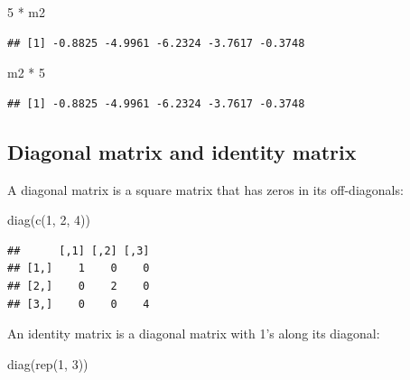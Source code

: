 \documentclass[
  12pt,
]{krantz}
\newenvironment{Shaded}{\begin{snugshade}}{\end{snugshade}}
\newcommand{\DecValTok}[1]{\textcolor[rgb]{0.00,0.00,0.81}{#1}}
\newcommand{\FunctionTok}[1]{\textcolor[rgb]{0.00,0.00,0.00}{#1}}
\newcommand{\NormalTok}[1]{#1}
\newcommand{\SpecialCharTok}[1]{\textcolor[rgb]{0.00,0.00,0.00}{#1}}
\theoremstyle{definition}
\theoremstyle{definition}
\theoremstyle{definition}
\theoremstyle{definition}
\theoremstyle{remark}
\begin{document}
\begin{Shaded}
\begin{Highlighting}[]
\DecValTok{5} \SpecialCharTok{*}\NormalTok{ m2}
\end{Highlighting}
\end{Shaded}

\begin{verbatim}
## [1] -0.8825 -4.9961 -6.2324 -3.7617 -0.3748
\end{verbatim}

\begin{Shaded}
\begin{Highlighting}[]
\NormalTok{m2 }\SpecialCharTok{*} \DecValTok{5}
\end{Highlighting}
\end{Shaded}

\begin{verbatim}
## [1] -0.8825 -4.9961 -6.2324 -3.7617 -0.3748
\end{verbatim}

\hypertarget{diagonal-matrix-and-identity-matrix}{%
\subsection{Diagonal matrix and identity matrix}\label{diagonal-matrix-and-identity-matrix}}

A diagonal matrix is a square matrix that has zeros in its off-diagonals:

\begin{Shaded}
\begin{Highlighting}[]
\FunctionTok{diag}\NormalTok{(}\FunctionTok{c}\NormalTok{(}\DecValTok{1}\NormalTok{, }\DecValTok{2}\NormalTok{, }\DecValTok{4}\NormalTok{))}
\end{Highlighting}
\end{Shaded}

\begin{verbatim}
##      [,1] [,2] [,3]
## [1,]    1    0    0
## [2,]    0    2    0
## [3,]    0    0    4
\end{verbatim}

An identity matrix is a diagonal matrix with 1's along its diagonal:

\begin{Shaded}
\begin{Highlighting}[]
\FunctionTok{diag}\NormalTok{(}\FunctionTok{rep}\NormalTok{(}\DecValTok{1}\NormalTok{, }\DecValTok{3}\NormalTok{))}
\end{Highlighting}
\end{Shaded}
\end{document}
